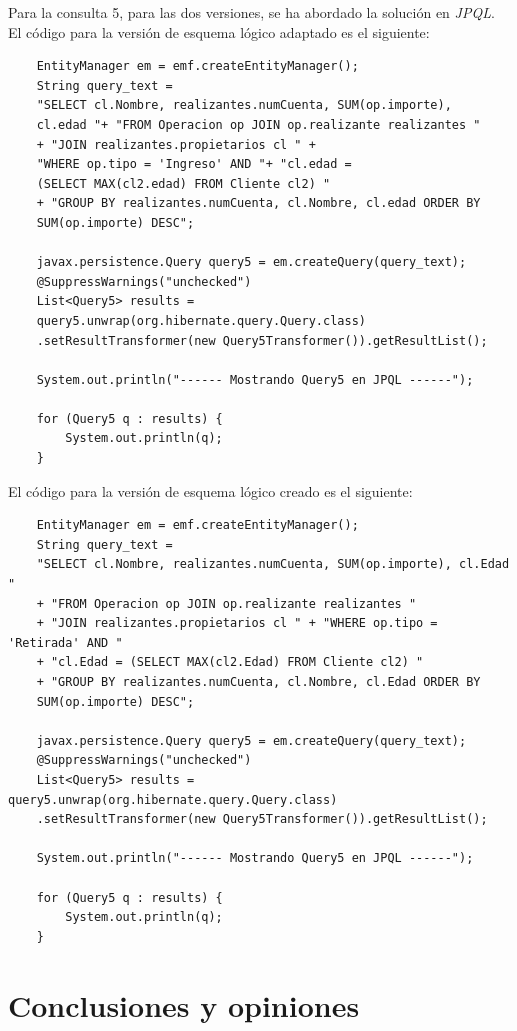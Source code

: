 \documentclass[11pt,a4paper]{article}
\begin{document}
Para la consulta 5, para las dos versiones, se ha abordado la solución en \emph{JPQL}. \\
El código para la versión de esquema lógico adaptado es el siguiente:

\begin{lstlisting}
	EntityManager em = emf.createEntityManager();
   	String query_text = 
    "SELECT cl.Nombre, realizantes.numCuenta, SUM(op.importe), 
    cl.edad "+ "FROM Operacion op JOIN op.realizante realizantes "
    + "JOIN realizantes.propietarios cl " + 
    "WHERE op.tipo = 'Ingreso' AND "+ "cl.edad = 
    (SELECT MAX(cl2.edad) FROM Cliente cl2) "
    + "GROUP BY realizantes.numCuenta, cl.Nombre, cl.edad ORDER BY 
    SUM(op.importe) DESC";

    javax.persistence.Query query5 = em.createQuery(query_text);
   	@SuppressWarnings("unchecked")
    List<Query5> results = 
    query5.unwrap(org.hibernate.query.Query.class)
    .setResultTransformer(new Query5Transformer()).getResultList();

   	System.out.println("------ Mostrando Query5 en JPQL ------");

  	for (Query5 q : results) {
   		System.out.println(q);
  	}
\end{lstlisting}

El código para la versión de esquema lógico creado es el siguiente:
\begin{lstlisting}
	EntityManager em = emf.createEntityManager();
    String query_text = 
   	"SELECT cl.Nombre, realizantes.numCuenta, SUM(op.importe), cl.Edad "
    + "FROM Operacion op JOIN op.realizante realizantes "
   	+ "JOIN realizantes.propietarios cl " + "WHERE op.tipo = 'Retirada' AND "
    + "cl.Edad = (SELECT MAX(cl2.Edad) FROM Cliente cl2) "
    + "GROUP BY realizantes.numCuenta, cl.Nombre, cl.Edad ORDER BY 			
    SUM(op.importe) DESC";

    javax.persistence.Query query5 = em.createQuery(query_text);
    @SuppressWarnings("unchecked")
    List<Query5> results = query5.unwrap(org.hibernate.query.Query.class)
    .setResultTransformer(new Query5Transformer()).getResultList();

    System.out.println("------ Mostrando Query5 en JPQL ------");

    for (Query5 q : results) {
       	System.out.println(q);
  	}
\end{lstlisting}

\section{Conclusiones y opiniones}
\end{document}
